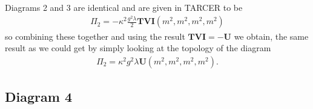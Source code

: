 \documentclass[11pt]{article}
\newcommand{\tarcer}{\textsf{TARCER} \! }
\begin{document}
\noindent\begin{minipage}{0.7\textwidth}
Diagrams 2 and 3 are identical and are given in \tarcer to be
\begin{align}
\Pi_2 = -\kappa^2 \frac{g^2\lambda}{2} \mathbf{TVI}(m^2,m^2,m^2,m^2)
\end{align}
so combining these together and using the result $ \mathbf{TVI}=-\mathbf{U}$ we obtain, the same result as we could get by simply looking at the topology of the diagram
\begin{align}
\Pi_2 =  \kappa^2 g^2\lambda \mathbf{U}(m^2,m^2,m^2,m^2).
\end{align}
\end{minipage}




\subsection*{Diagram 4}
\end{document}
